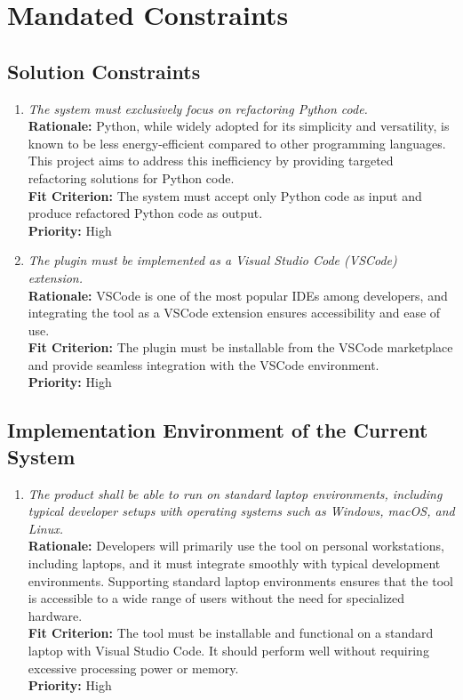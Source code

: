 \documentclass[12pt]{article}
\begin{document}
\section{Mandated Constraints}
\subsection{Solution Constraints}
\begin{enumerate}[label=MD-SL \arabic*., wide=0pt, leftmargin=*]
  \item \emph{The system must exclusively focus on refactoring Python code.}\\[2mm]
    {\bf Rationale:} Python, while widely adopted for its simplicity and versatility, is known to be less energy-efficient compared to other programming languages. This project aims to address this inefficiency by providing targeted refactoring solutions for Python code.\\
    {\bf Fit Criterion:} The system must accept only Python code as input and produce refactored Python code as output.\\
    {\bf Priority:} High

  \item \emph{The plugin must be implemented as a Visual Studio Code (VSCode) extension.}\\[2mm]
    {\bf Rationale:} VSCode is one of the most popular IDEs among developers, and integrating the tool as a VSCode extension ensures accessibility and ease of use.\\
    {\bf Fit Criterion:} The plugin must be installable from the VSCode marketplace and provide seamless integration with the VSCode environment.\\
    {\bf Priority:} High
\end{enumerate}

\subsection{Implementation Environment of the Current System}
\begin{enumerate}[label=MD-EC \arabic*., wide=0pt, leftmargin=*]
  \item \emph{The product shall be able to run on standard laptop
      environments, including typical developer setups with operating
    systems such as Windows, macOS, and Linux.}\\[2mm]
    {\bf Rationale:} Developers will primarily use the tool on
    personal workstations, including laptops, and it must integrate
    smoothly with typical development environments. Supporting
    standard laptop environments ensures that the tool is accessible
    to a wide range of users without the need for specialized hardware.\\
    {\bf Fit Criterion:} The tool must be installable and functional
    on a standard laptop with Visual Studio Code. It should perform
    well without requiring excessive processing power or memory.\\
    {\bf Priority:} High
\end{enumerate}
\end{document}
